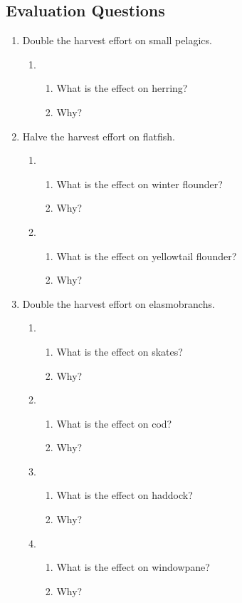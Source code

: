 \subsection{Evaluation Questions}

\begin{enumerate}
\item Double the harvest effort on small pelagics.

\begin{enumerate}
\item 
\begin{enumerate}
\item What is the effect on herring?
\item Why?
\end{enumerate}
\end{enumerate}

\item Halve the harvest effort on flatfish.

\begin{enumerate}
\item 
\begin{enumerate}
\item What is the effect on winter flounder?
\item Why?
\end{enumerate}

\item 
\begin{enumerate}
\item What is the effect on yellowtail flounder?
\item Why?
\end{enumerate}
\end{enumerate}

\item Double the harvest effort on elasmobranchs.

\begin{enumerate}
\item 
\begin{enumerate}
\item What is the effect on skates?
\item Why?
\end{enumerate}

\item 
\begin{enumerate}
\item What is the effect on cod?
\item Why?
\end{enumerate}

\item 
\begin{enumerate}
\item What is the effect on haddock?
\item Why?
\end{enumerate}

\item 
\begin{enumerate}
\item What is the effect on windowpane?
\item Why?
\end{enumerate}
\end{enumerate}

\end{enumerate}